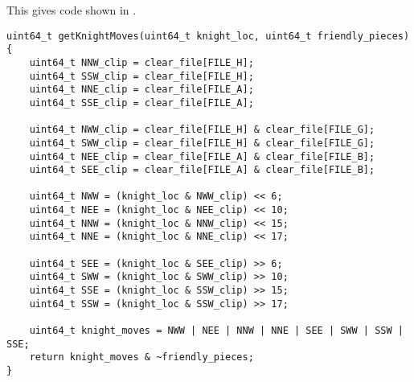 %
This gives code shown in .
%
\begin{listing}
\begin{verbatim}
uint64_t getKnightMoves(uint64_t knight_loc, uint64_t friendly_pieces) {
	uint64_t NNW_clip = clear_file[FILE_H];
	uint64_t SSW_clip = clear_file[FILE_H];
	uint64_t NNE_clip = clear_file[FILE_A];
	uint64_t SSE_clip = clear_file[FILE_A];
	
	uint64_t NWW_clip = clear_file[FILE_H] & clear_file[FILE_G];
	uint64_t SWW_clip = clear_file[FILE_H] & clear_file[FILE_G];
	uint64_t NEE_clip = clear_file[FILE_A] & clear_file[FILE_B];
	uint64_t SEE_clip = clear_file[FILE_A] & clear_file[FILE_B];
	
	uint64_t NWW = (knight_loc & NWW_clip) << 6;
	uint64_t NEE = (knight_loc & NEE_clip) << 10;
	uint64_t NNW = (knight_loc & NNW_clip) << 15;
	uint64_t NNE = (knight_loc & NNE_clip) << 17;
	
	uint64_t SEE = (knight_loc & SEE_clip) >> 6;
	uint64_t SWW = (knight_loc & SWW_clip) >> 10;
	uint64_t SSE = (knight_loc & SSW_clip) >> 15;
	uint64_t SSW = (knight_loc & SSW_clip) >> 17;
	
	uint64_t knight_moves = NWW | NEE | NNW | NNE | SEE | SWW | SSW | SSE;
	return knight_moves & ~friendly_pieces;
}
\end{verbatim}
\label{fig: knight moves}
\end{listing}
%
